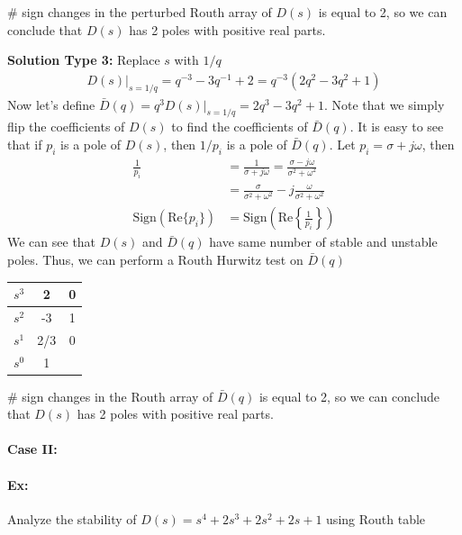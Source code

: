 \documentclass[twoside]{article}
\begin{document}
$\#$ sign changes in the perturbed Routh array of $D(s)$ is equal to 2, so
we can conclude that $D(s)$ has 2 poles with positive real parts.

\newpage

\textbf{Solution Type 3:} Replace $s$ with $1/q$
%
\begin{align*}
  D(s)|_{s =1/q} = q^{-3} - 3 q^{-1} + 2 = q^{-3} 
  \left( 2 q^{2} - 3 q^2 + 1 \right)
\end{align*}
%
Now let's define $\bar{D}(q) = q^3 D(s)|_{s =1/q} =  2 q^3 - 3 q^2 +
1$. 
Note that we simply flip the coefficients of $D(s)$
to find the coefficients of $\bar{D}(q)$. It is easy to see that 
if $p_i$ is a pole of $D(s)$, then $1/p_i$ is a pole of $\bar{D}(q)$.
Let $p_i = \sigma + j \omega$, then 
%
\begin{align*}
  \frac{1}{p_i} &= \frac{1}{\sigma + j \omega} = \frac{\sigma - j
  \omega}{\sigma^2 + \omega^2}
\\
&= \frac{\sigma}{\sigma^2 + \omega^2} - j \frac{
  \omega}{\sigma^2 + \omega^2}
\\
\mathrm{Sign} ( \mathrm{Re} \lbrace p_i \rbrace ) &= 
\mathrm{Sign} \left( \mathrm{Re} \left\lbrace \frac{1}{p_i} \right\rbrace \right)
\end{align*}
%
We can see that $D(s)$ and $\bar{D}(q)$ have same number of stable
and unstable poles. Thus, we can perform a Routh Hurwitz test on
$\bar{D}(q)$
%
\begin{table}[h]
\begin{center}
\begin{tabular}{|c || c || c  |}
\hline
$s^3$ & 2 & 0 
\\ \hline
$s^2$ & -3 & 1
\\ \hline
$s^1$  & 2/3 & 0 
\\ \hline
$s^0$  & 1 & 
\\ \hline
\end{tabular}
\end{center}
\end{table}

$\#$ sign changes in the Routh array of $\bar{D}(q)$ is equal to 2, so
we can conclude that $D(s)$ has 2 poles with positive real parts.

\paragraph{Case II:}

\paragraph{Ex:} Analyze the stability of $D(s) = s^4 + 2 s^3 + 2 s^2 + 2 s + 1$ using Routh table
\end{document}
